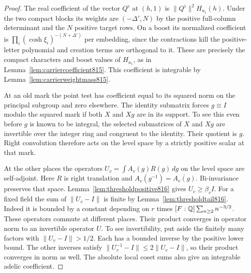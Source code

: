\documentclass[a4paper,11pt]{article}
\theoremstyle{definition}
\theoremstyle{remark}
\numberwithin{equation}{section}
\begin{document}
\begin{proof}
The real coefficient of the vector \(Q^\flat\) at
\((h,1)\) is \(\|Q^\flat\|^2 H_{u_1}(h)\). Under the two
compact blocks its weights are \((-\Delta',N)\) by the
positive full-column determinant and the \(N\) positive
target rows. On a boost its normalized coefficient is
\(\prod_i(\cosh\xi_i)^{-(N+\Delta')}\) per embedding,
since the contractions kill the positive-letter polynomial
and creation terms are orthogonal to it. These are precisely
the compact characters and boost values of \(H_{u_1}\), as
in Lemma~\ref{lem:carriercoefficient815}. This coefficient
is integrable by Lemma~\ref{lem:carrierweightmass815}.

At an old mark the point test has coefficient equal to
its squared norm on the principal subgroup and zero
elsewhere. The identity submatrix forces \(g\equiv I\)
modulo the squared mark if both \(X\) and \(Xg\) are in
its support. To see this even before \(g\) is known to
be integral, the selected submatrices of \(X\) and \(Xg\)
are invertible over the integer ring and congruent to
the identity. Their quotient is \(g\).
Right convolution therefore acts on the level space
by a strictly positive scalar at that mark.

At the other places the operators
\(U_v=\int A_v(g)R(g)\,dg\) on the level space are
self-adjoint. Here \(R\) is right translation and
\(A_v(g^{-1})=\overline{A_v(g)}\). Bi-invariance preserves
that space. Lemma~\ref{lem:thresholdpositive816} gives
\(U_v\ge\beta_v I\). For a fixed field the sum of
\(\|U_v-I\|\) is finite by Lemma~\ref{lem:thresholdtail816}.
Indeed it is bounded by a constant depending on \(r\)
times \([F:\mathbb Q]\sum_{n\ge2}n^{-3/2}\). These operators
commute at different places. Their product converges in
operator norm to an invertible operator \(U\). To see
invertibility, put aside the finitely many factors with
\(\|U_v-I\|>1/2\). Each has a bounded inverse by the
positive lower bound. The other inverses satisfy
\(\|U_v^{-1}-I\|\le2\|U_v-I\|\), so their product
converges in norm as well. The absolute local coset sums
also give an integrable adelic coefficient.


\end{proof}
\end{document}
